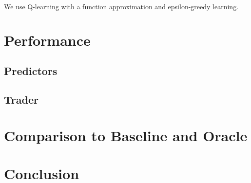 \documentclass[12pt]{article}
\begin{document}
We use Q-learning with a function approximation and epsilon-greedy
learning.


\section{Performance}

\subsection{Predictors}
\subsection{Trader}

\section{Comparison to Baseline and Oracle}

\section{Conclusion}




\end{document}

